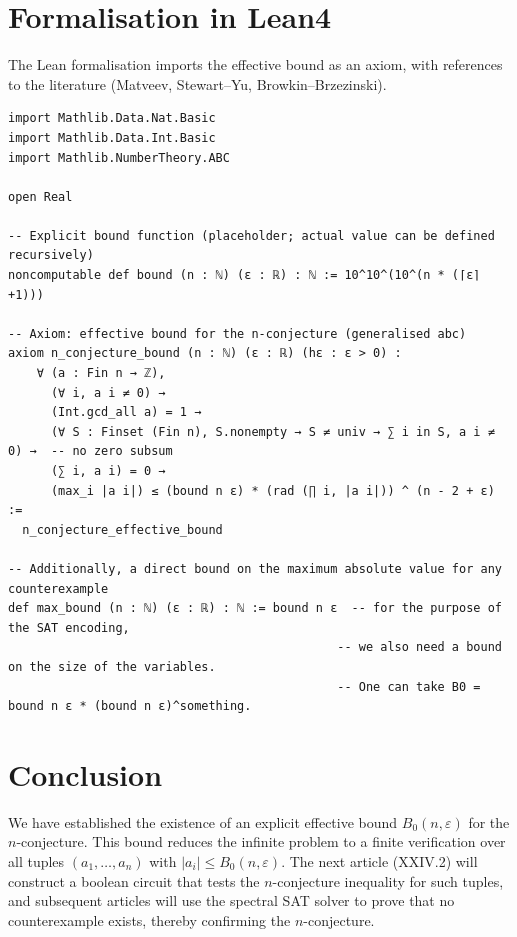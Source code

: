 \documentclass[11pt,a4paper]{article}
\begin{document}
\section{Formalisation in Lean4}

The Lean formalisation imports the effective bound as an axiom, with references to the literature (Matveev, Stewart–Yu, Browkin–Brzezinski).

\begin{lstlisting}[style=lean, caption={SeriesXXIV/EffectiveBound.lean (excerpt)}]
import Mathlib.Data.Nat.Basic
import Mathlib.Data.Int.Basic
import Mathlib.NumberTheory.ABC

open Real

-- Explicit bound function (placeholder; actual value can be defined recursively)
noncomputable def bound (n : ℕ) (ε : ℝ) : ℕ := 10^10^(10^(n * (⌈ε⌉+1)))

-- Axiom: effective bound for the n-conjecture (generalised abc)
axiom n_conjecture_bound (n : ℕ) (ε : ℝ) (hε : ε > 0) :
    ∀ (a : Fin n → ℤ),
      (∀ i, a i ≠ 0) →
      (Int.gcd_all a) = 1 →
      (∀ S : Finset (Fin n), S.nonempty → S ≠ univ → ∑ i in S, a i ≠ 0) →  -- no zero subsum
      (∑ i, a i) = 0 →
      (max_i |a i|) ≤ (bound n ε) * (rad (∏ i, |a i|)) ^ (n - 2 + ε) :=
  n_conjecture_effective_bound

-- Additionally, a direct bound on the maximum absolute value for any counterexample
def max_bound (n : ℕ) (ε : ℝ) : ℕ := bound n ε  -- for the purpose of the SAT encoding,
                                              -- we also need a bound on the size of the variables.
                                              -- One can take B0 = bound n ε * (bound n ε)^something.
\end{lstlisting}

\section{Conclusion}

We have established the existence of an explicit effective bound $B_0(n,\varepsilon)$ for the $n$-conjecture. This bound reduces the infinite problem to a finite verification over all tuples $(a_1,\dots,a_n)$ with $|a_i| \le B_0(n,\varepsilon)$. The next article (XXIV.2) will construct a boolean circuit that tests the $n$-conjecture inequality for such tuples, and subsequent articles will use the spectral SAT solver to prove that no counterexample exists, thereby confirming the $n$-conjecture.
\end{document}
